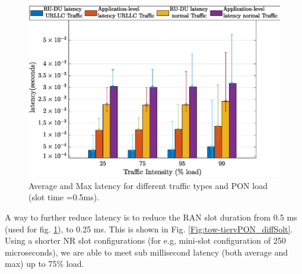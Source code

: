 \documentclass[a4paper, oneside, twocolumn, notitlepage, 10pt]{extarticle_ecoc}
\begin{document}
\begin{figure}[h]
	\centering
	\vspace{-4mm}
	\includegraphics[clip, trim={0 0 0 0}, width=\linewidth]{./Figures/tow-tiervPON.eps}
	\caption{Average and Max latency for different traffic types and PON load (slot time =0.5ms).}
	\label{Fig:tow-tiervPON}
\end{figure}
A way to further reduce latency is to reduce the RAN slot duration from 0.5 ms (used for fig. \ref{Fig:tow-tiervPON}), to 0.25 ms. This is shown in Fig. \ref{Fig:tow-tiervPON_diffSolt}. %
Using a shorter NR slot configurations (for e.g, mini-slot configuration of 250 microseconds), we are able to meet sub millisecond latency (both average and max) up to 75\% load. %
\end{document}
